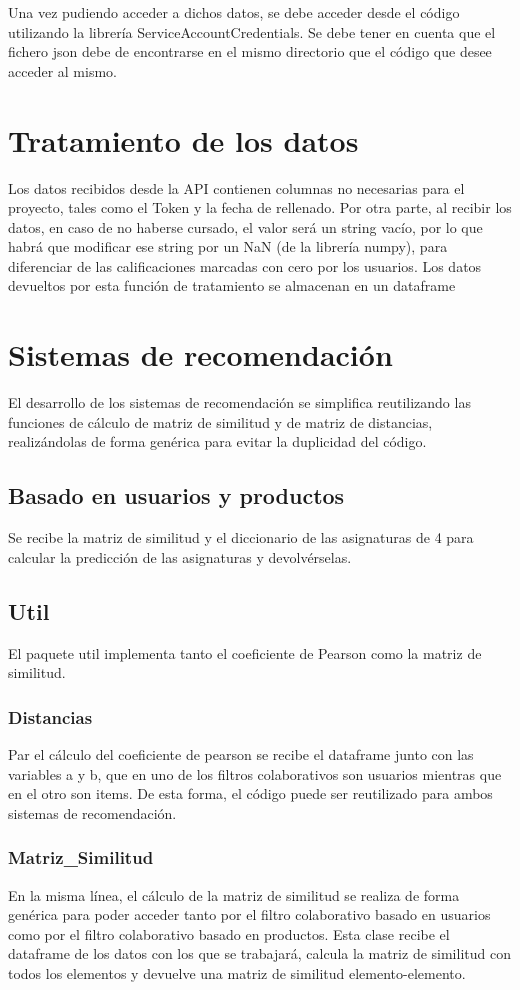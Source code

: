 Una vez pudiendo acceder a dichos datos, se debe acceder desde el código utilizando la librería ServiceAccountCredentials. Se debe tener en cuenta que el fichero json debe de encontrarse en el mismo directorio que el código que desee acceder al mismo. 


\section{Tratamiento de los datos}
Los datos recibidos desde la API contienen columnas no necesarias para el proyecto, tales como el Token y la fecha de rellenado. Por otra parte, al recibir los datos, en caso de no haberse cursado, el valor será un string vacío, por lo que habrá que modificar ese string por un NaN (de la librería numpy), para diferenciar de las calificaciones marcadas con cero por los usuarios.   Los datos devueltos por esta función de tratamiento se almacenan en un dataframe

\section{Sistemas de recomendación}
El desarrollo de los sistemas de recomendación se simplifica reutilizando las funciones de cálculo de matriz de similitud y de matriz de distancias, realizándolas de forma genérica para evitar la duplicidad del código. 
\subsection{Basado en usuarios y productos}
Se recibe la matriz de similitud y el diccionario de las asignaturas de 4 para calcular la predicción de las asignaturas y devolvérselas. 

\subsection{Util}
El paquete util implementa tanto el coeficiente de Pearson como la matriz de similitud. 
\subsubsection{Distancias}
Par el cálculo del coeficiente de pearson se recibe el dataframe junto con las variables a y b, que en uno de los filtros colaborativos son usuarios mientras que en el otro son items. De esta forma, el código puede ser reutilizado para ambos sistemas de recomendación. 
\subsubsection{Matriz\_Similitud}
En la misma línea, el cálculo de la matriz de similitud se realiza de forma genérica para poder acceder tanto por el filtro colaborativo basado en usuarios como por el filtro colaborativo basado en productos. Esta clase recibe el dataframe de los datos con los que se trabajará, calcula la matriz de similitud con todos los elementos y devuelve una matriz de similitud elemento-elemento. 


